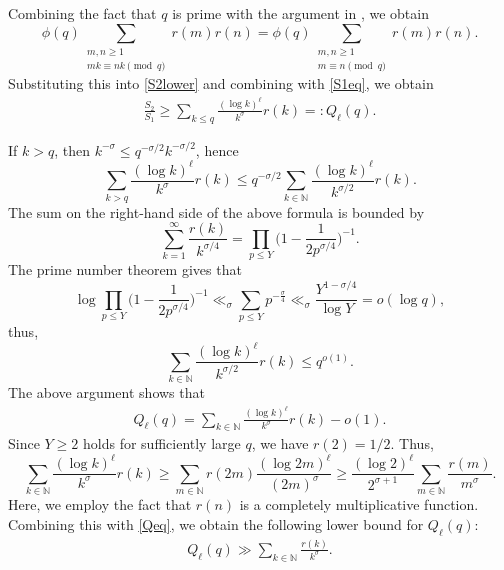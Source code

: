 \documentclass[12pt,reqno]{amsart}
\theoremstyle{definition}
\numberwithin{equation}{section}
\newcommand{\Bg}{\Big}
\newcommand{\mbn}{\mathbb{N}}
\begin{document}
Combining the fact that \(q\) is prime with the argument in \cite[p. 10]{yang2023omega}, we obtain
\[
\phi(q)\sum_{\substack{m,n \ge 1 \\ mk \equiv nk \pmod q}} r(m)r(n) = \phi(q)\sum_{\substack{m,n \ge 1 \\ m \equiv n \pmod q}} r(m)r(n).
\]
Substituting this into \eqref{S2lower} and combining with \eqref{S1eq}, we obtain
\begin{align}
    \label{S2S1lower}
    \frac{S_2}{S_1} \ge \sum_{k \le q}\frac{(\log k )^\ell}{k^\sigma}r(k) =: Q_\ell(q).
\end{align}

\par
If \(k > q\), then \(k^{-\sigma} \le q^{-\sigma/2} k^{-\sigma/2}\), hence
\[
 \sum_{k > q}\frac{(\log k )^\ell}{k^\sigma}r(k) \le q^{-\sigma/2} \sum_{k \in \mbn}\frac{(\log k )^\ell}{k^{\sigma/2}}r(k).
\]
The sum on the right-hand side of the above formula is bounded by
\[
\sum_{k=1}^{\infty}\frac{r(k)}{k^{\sigma/4}}=\prod_{p\leq Y}\Bg(1-\frac{1}{2p^{\sigma/4}}\Bg)^{-1}.
\]
The prime number theorem gives that 
\[
\log \prod_{p\leq Y}\Bg(1-\frac{1}{2p^{\sigma/4}}\Bg)^{-1}\ll_{\sigma}\sum_{p\leq Y}p^{-\frac{\sigma}{4} }\ll_\sigma\frac{Y^{1-\sigma/4}}{\log Y}=o(\log q),
\]
thus, 
\[
\sum_{k \in \mbn}\frac{(\log k )^\ell}{k^{\sigma/2}}r(k) \le q^{o(1)}.
\]
The above argument shows that
\begin{align}
    \label{Qeq}
    Q_\ell(q) = \sum_{k \in \mbn}\frac{(\log k )^\ell}{k^\sigma}r(k) -o(1).
\end{align}
Since $Y\ge 2$ holds for sufficiently large $q$, we have $r(2)=1/2$. Thus, 
\[
\sum_{k\in\mbn}\frac{(\log k)^\ell}{k^\sigma}r(k)
	\geq\sum_{m\in\mbn}r(2m)\frac{(\log 2m)^\ell}{(2m)^\sigma}\geq\frac{(\log 2)^\ell}{2^{\sigma+1}}\sum_{m\in\mbn}\frac{r(m)}{m^\sigma}.
\]
Here, we employ the fact that \(r(n)\) is a completely multiplicative function. Combining this with \eqref{Qeq}, we obtain the following lower bound for \(Q_\ell(q)\):
\begin{align}
    \label{Qlower}
    Q_\ell(q) \gg \sum_{k \in \mbn} \frac{r(k)}{k^\sigma}.
\end{align}
\end{document}

